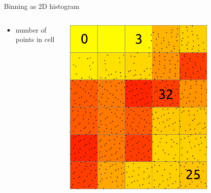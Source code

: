 \documentclass[xcolor={dvipsnames,usenames},beamer,aspectratio=169]{beamer}
\begin{document}
\begin{frame}{Binning as 2D histogram}

\begin{columns}
\begin{column}{0.4\textwidth}

 \begin{itemize}
  \item number of points in cell
\end{itemize}

\end{column}
\begin{column}{0.45\textwidth}

\begin{center}
  \includegraphics[width=0.75\textwidth]{features/binning_count}
\end{center}

\end{column}
\end{columns}

\end{frame}
\end{document}
